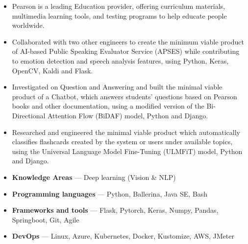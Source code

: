 \documentclass[12pt,a4paper,withhyper]{altacv}
\begin{document}
\clearpage
{}   %
\begin{itemize}
    \item Pearson is a leading Education provider, offering curriculum materials, multimedia learning tools, and testing programs to help educate people worldwide.
    \item Collaborated with two other engineers to create the minimum viable product of AI-based Public Speaking Evaluator Service (APSES) while contributing to emotion detection and speech analysis features, using Python, Keras, OpenCV, Kaldi and Flask.
    \item Investigated on Question and Answering and built the minimal viable product of a Chatbot, which answers students' questions based on Pearson books and other documentation, using a modified version of the Bi-Directional Attention Flow (BiDAF) model, Python and Django.
    \item Researched and engineered the minimal viable product which automatically classifies flashcards created by the system or users under available topics, using the Universal Language Model Fine-Tuning (ULMFiT) model, Python and Django.
\end{itemize}

\medskip



\medskip


\begin{itemize}
    \item \textbf{Knowledge Areas } --- Deep learning (Vision \& NLP)
    \item \textbf{Programming languages} --- Python, Ballerina, Java SE, Bash
    \item \textbf{Frameworks and tools} --- Flask, Pytorch, Keras, Numpy, Pandas, Springboot, Git, Agile
    \item \textbf{DevOps} --- Linux, Azure, Kubernetes, Docker, Kustomize, AWS, JMeter
\end{itemize}
\end{document}
